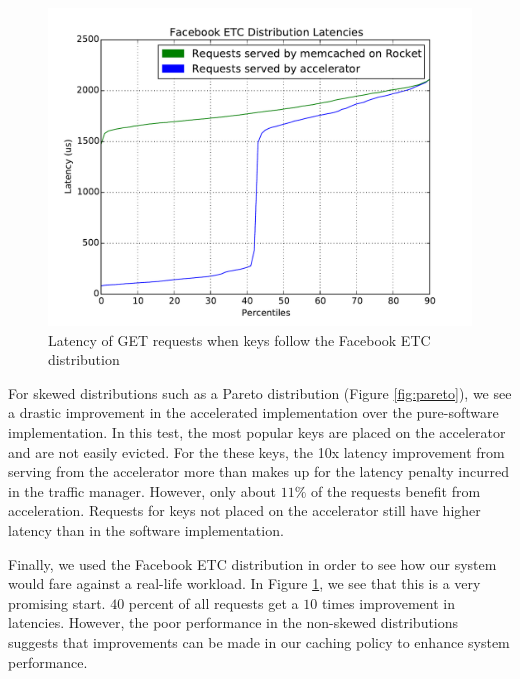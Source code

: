 \begin{figure}[t]
\begin{center}
\includegraphics[width=\linewidth]{etc.pdf}
\caption{Latency of GET requests when keys follow the Facebook ETC distribution}
\label{fig:etc}
\end{center}
\end{figure}

For skewed distributions such as a Pareto distribution (Figure \ref{fig:pareto}),
we see a drastic improvement in the accelerated implementation over the
pure-software implementation. In this test, the most popular keys are placed
on the accelerator and are not easily evicted. For the these keys, the 10x
latency improvement from serving from the accelerator more than makes up
for the latency penalty incurred in the traffic manager. However, only about
$11\%$ of the requests benefit from acceleration. Requests for keys not placed
on the  accelerator still have higher latency than in the software implementation.

Finally, we used the Facebook ETC distribution \cite{AXFJP2012} in order to see
how our system would fare against a real-life workload. In Figure
\ref{fig:etc}, we see that this is a very promising start. $40$ percent of all
requests get a $10$ times improvement in latencies. However, the poor
performance in the non-skewed distributions suggests that improvements can be
made in our caching policy to enhance system performance.
